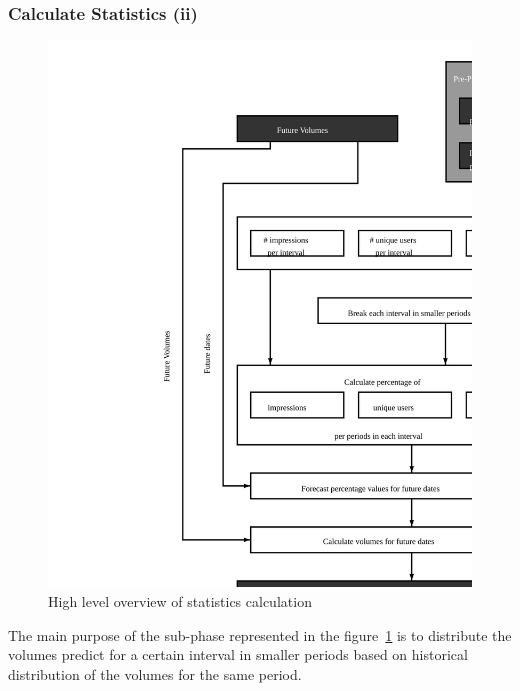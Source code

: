 \subsubsection{Calculate Statistics (ii)}\label{subsubsec:stats}

\begin{figure}[h] \begin{center} \leavevmode
\includegraphics[]{calculate_stats} \caption{ High level overview
of statistics calculation} \label{fig:calculate_stats_ii} \end{center} \end{figure}

The main purpose of the sub-phase represented in the figure~\ref{fig:calculate_stats_ii} is
to distribute the volumes predict for a certain interval in smaller periods
based on historical distribution of the volumes for the same period.

